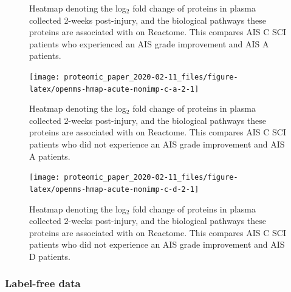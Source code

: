 \documentclass[9pt,lineno]{elife}
\newcommand{\blandscape}{\begin{landscape}}
\newcommand{\elandscape}{\end{landscape}}
\begin{document}
\begin{landscape}
\begin{landscape}
\begin{landscape}
\begin{figure}
{}

\caption[Heatmap - iTRAQ - Acute C Improvers VS Acute A]{Heatmap denoting the log\(_2\) fold change of proteins in plasma collected 2-weeks post-injury, and the biological pathways these proteins are associated with on Reactome. This compares AIS C SCI patients who experienced an AIS grade improvement and AIS A patients.}\label{fig:openms-hmap-acute-imp-c-a-2}
\end{figure}

\elandscape
\blandscape



\begin{figure}

{\centering \texttt{[image: proteomic\_paper\_2020-02-11\_files/figure-latex/openms-hmap-acute-nonimp-c-a-2-1]} 

}

\caption[Heatmap - iTRAQ - Acute C Non-Improvers VS Acute A]{Heatmap denoting the log\(_2\) fold change of proteins in plasma collected 2-weeks post-injury, and the biological pathways these proteins are associated with on Reactome. This compares AIS C SCI patients who did not experience an AIS grade improvement and AIS A patients.}\label{fig:openms-hmap-acute-nonimp-c-a-2}
\end{figure}

\elandscape
\blandscape



\begin{figure}

{\centering \texttt{[image: proteomic\_paper\_2020-02-11\_files/figure-latex/openms-hmap-acute-nonimp-c-d-2-1]} 

}

\caption[Heatmap - iTRAQ - Acute C Non-Improvers VS Acute D]{Heatmap denoting the log\(_2\) fold change of proteins in plasma collected 2-weeks post-injury, and the biological pathways these proteins are associated with on Reactome. This compares AIS C SCI patients who did not experience an AIS grade improvement and AIS D patients.}\label{fig:openms-hmap-acute-nonimp-c-d-2}
\end{figure}

\elandscape
\clearpage

\hypertarget{label-free-data}{%
\subsubsection{Label-free data}\label{label-free-data}}

\clearpage
\blandscape




\end{landscape}
\end{landscape}
\end{landscape}
\end{document}
